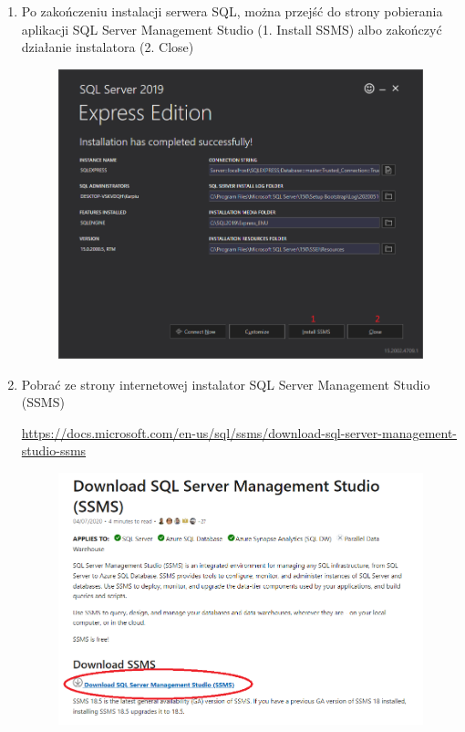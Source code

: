 \documentclass[12pt,a4paper]{article}
\begin{document}
\begin{enumerate}
				\item Po zakończeniu instalacji serwera SQL, można przejść do strony pobierania aplikacji SQL Server Management Studio (1. Install SSMS) albo zakończyć działanie
					instalatora (2. Close)
					\begin{figure}[H]
						\centering
						\includegraphics[scale=0.3]{img/Local_Install_5.png}
					\end{figure}		
							
				\item Pobrać ze strony internetowej instalator SQL Server Management Studio (SSMS)
					\begin{tcolorbox}[minipage,colback=white,arc=0pt,outer arc=0pt, fontupper=\footnotesize]
						\url{https://docs.microsoft.com/en-us/sql/ssms/download-sql-server-management-studio-ssms}
					\end{tcolorbox}
					\begin{figure}[H]
						\centering
						\includegraphics[scale=0.3]{img/Local_Install_5.5.png}
					\end{figure}
									

\end{enumerate}
\end{document}
